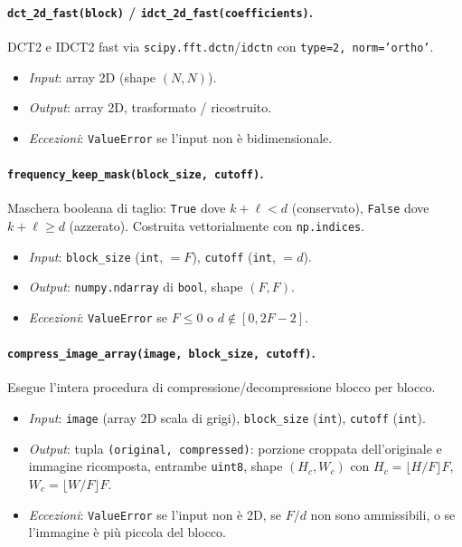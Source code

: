 \documentclass[11pt,a4paper]{article}
\begin{document}
\paragraph{\texttt{dct\_2d\_fast(block)} / \texttt{idct\_2d\_fast(coefficients)}.}
DCT2 e IDCT2 fast via \texttt{scipy.fft.dctn}/\texttt{idctn} con
\texttt{type=2, norm='ortho'}.
\begin{itemize}
  \item \emph{Input}: array 2D (shape $(N,N)$).
  \item \emph{Output}: array 2D, trasformato / ricostruito.
  \item \emph{Eccezioni}: \texttt{ValueError} se l'input non è bidimensionale.
\end{itemize}

\paragraph{\texttt{frequency\_keep\_mask(block\_size, cutoff)}.}
Maschera booleana di taglio: \texttt{True} dove $k+\ell<d$ (conservato),
\texttt{False} dove $k+\ell\ge d$ (azzerato). Costruita vettorialmente con
\texttt{np.indices}.
\begin{itemize}
  \item \emph{Input}: \texttt{block\_size} (\texttt{int}, $=F$), \texttt{cutoff}
        (\texttt{int}, $=d$).
  \item \emph{Output}: \texttt{numpy.ndarray} di \texttt{bool}, shape $(F,F)$.
  \item \emph{Eccezioni}: \texttt{ValueError} se $F\le 0$ o $d\notin[0,2F-2]$.
\end{itemize}

\paragraph{\texttt{compress\_image\_array(image, block\_size, cutoff)}.}
Esegue l'intera procedura di compressione/decompressione blocco per blocco.
\begin{itemize}
  \item \emph{Input}: \texttt{image} (array 2D scala di grigi), \texttt{block\_size}
        (\texttt{int}), \texttt{cutoff} (\texttt{int}).
  \item \emph{Output}: tupla \texttt{(original, compressed)}: porzione
        croppata dell'originale e immagine ricomposta, entrambe \texttt{uint8},
        shape $(H_c,W_c)$ con $H_c=\lfloor H/F\rfloor F$, $W_c=\lfloor W/F\rfloor F$.
  \item \emph{Eccezioni}: \texttt{ValueError} se l'input non è 2D, se $F/d$
        non sono ammissibili, o se l'immagine è più piccola del blocco.
\end{itemize}
\end{document}

